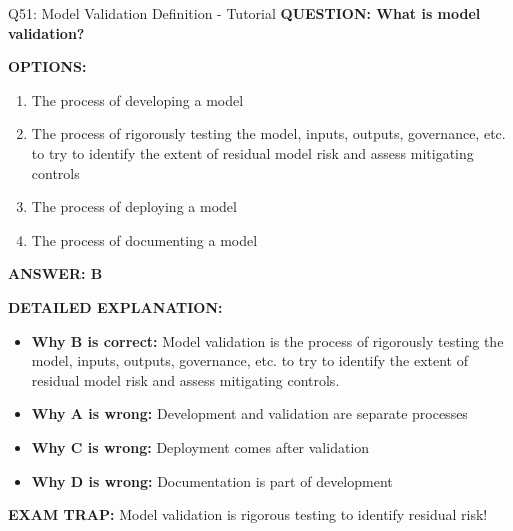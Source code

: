\documentclass[8pt]{beamer}
\begin{document}
	\begin{frame}{Q51: Model Validation Definition - Tutorial}
		\fontsize{6.5}{7.5}\selectfont
		\textbf{QUESTION: What is model validation?}
		
		\vspace{0.1cm}
		\textbf{OPTIONS:}
		\begin{enumerate}
			\item The process of developing a model
			\item The process of rigorously testing the model, inputs, outputs, governance, etc. to try to identify the extent of residual model risk and assess mitigating controls
			\item The process of deploying a model
			\item The process of documenting a model
		\end{enumerate}
		
		\vspace{0.1cm}
		\textcolor{myblue}{\textbf{ANSWER: B}}
		
		\vspace{0.1cm}
		\textbf{DETAILED EXPLANATION:}
		\begin{itemize}
			\item \textbf{Why B is correct:} Model validation is the process of rigorously testing the model, inputs, outputs, governance, etc. to try to identify the extent of residual model risk and assess mitigating controls.
			\item \textbf{Why A is wrong:} Development and validation are separate processes
			\item \textbf{Why C is wrong:} Deployment comes after validation
			\item \textbf{Why D is wrong:} Documentation is part of development
		\end{itemize}
		
		\textcolor{myred}{\textbf{EXAM TRAP:}} Model validation is \textcolor{myblue}{rigorous testing to identify residual risk}!
	\end{frame}
	
\end{document}
